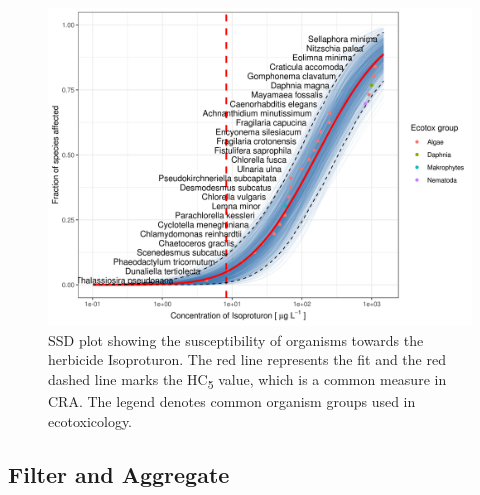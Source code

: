 \documentclass[english]{article}
\begin{document}
\begin{figure}[h!]
    \dentering
    \includegraphics[width=1\linewidth]{article/figures/ssd2_boot.png}
    \caption{SSD plot showing the susceptibility of organisms towards the herbicide Isoproturon. The red line represents the fit and the red dashed line marks the HC\textsubscript{5} value, which is a common measure in CRA. The legend denotes common organism groups used in ecotoxicology.}
    \label{fig:ssd-isoproturon}
\end{figure}

\subsection*{Filter and Aggregate}
\end{document}
